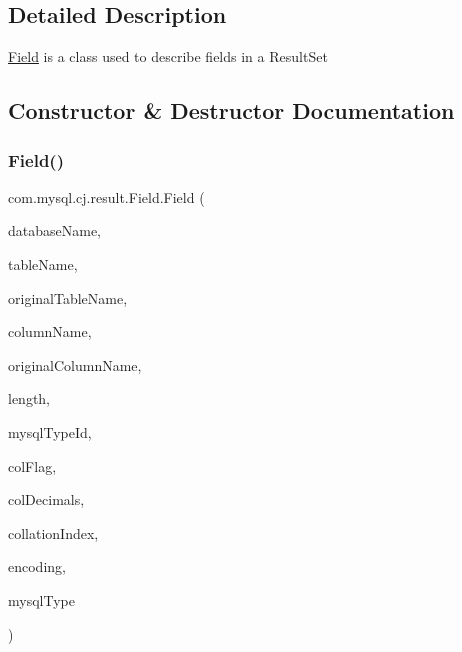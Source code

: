\subsection{Detailed Description}
\mbox{\hyperlink{classcom_1_1mysql_1_1cj_1_1result_1_1_field}{Field}} is a class used to describe fields in a Result\+Set 

\subsection{Constructor \& Destructor Documentation}
\mbox{\label{classcom_1_1mysql_1_1cj_1_1result_1_1_field_ab848d3e583a486ff56d0892152bcf8d0}} 
\subsubsection{\texorpdfstring{Field()}{Field()}\hspace{0.1cm}{\footnotesize\ttfamily [1/2]}}
{\footnotesize\ttfamily com.\+mysql.\+cj.\+result.\+Field.\+Field (\begin{DoxyParamCaption}\item[{\mbox{\hyperlink{classcom_1_1mysql_1_1cj_1_1util_1_1_lazy_string}{Lazy\+String}}}]{database\+Name,  }\item[{\mbox{\hyperlink{classcom_1_1mysql_1_1cj_1_1util_1_1_lazy_string}{Lazy\+String}}}]{table\+Name,  }\item[{\mbox{\hyperlink{classcom_1_1mysql_1_1cj_1_1util_1_1_lazy_string}{Lazy\+String}}}]{original\+Table\+Name,  }\item[{\mbox{\hyperlink{classcom_1_1mysql_1_1cj_1_1util_1_1_lazy_string}{Lazy\+String}}}]{column\+Name,  }\item[{\mbox{\hyperlink{classcom_1_1mysql_1_1cj_1_1util_1_1_lazy_string}{Lazy\+String}}}]{original\+Column\+Name,  }\item[{long}]{length,  }\item[{int}]{mysql\+Type\+Id,  }\item[{short}]{col\+Flag,  }\item[{int}]{col\+Decimals,  }\item[{int}]{collation\+Index,  }\item[{String}]{encoding,  }\item[{\mbox{\hyperlink{enumcom_1_1mysql_1_1cj_1_1_mysql_type}{Mysql\+Type}}}]{mysql\+Type }\end{DoxyParamCaption})}

